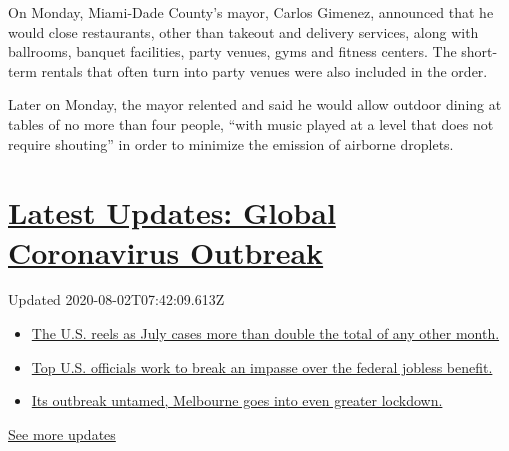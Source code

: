 On Monday, Miami-Dade County's mayor, Carlos Gimenez, announced that he
would close restaurants, other than takeout and delivery services, along
with ballrooms, banquet facilities, party venues, gyms and fitness
centers. The short-term rentals that often turn into party venues were
also included in the order.

Later on Monday, the mayor relented and said he would allow outdoor
dining at tables of no more than four people, ``with music played at a
level that does not require shouting'' in order to minimize the emission
of airborne droplets.

\hypertarget{latest-updates-global-coronavirus-outbreak}{%
\section{\texorpdfstring{\href{https://www.nytimes.com/2020/08/01/world/coronavirus-covid-19.html?action=click\&pgtype=Article\&state=default\&region=MAIN_CONTENT_1\&context=storylines_live_updates}{Latest
Updates: Global Coronavirus
Outbreak}}{Latest Updates: Global Coronavirus Outbreak}}\label{latest-updates-global-coronavirus-outbreak}}

Updated 2020-08-02T07:42:09.613Z

\begin{itemize}
\tightlist
\item
  \href{https://www.nytimes.com/2020/08/01/world/coronavirus-covid-19.html?action=click\&pgtype=Article\&state=default\&region=MAIN_CONTENT_1\&context=storylines_live_updates\#link-34047410}{The
  U.S. reels as July cases more than double the total of any other
  month.}
\item
  \href{https://www.nytimes.com/2020/08/01/world/coronavirus-covid-19.html?action=click\&pgtype=Article\&state=default\&region=MAIN_CONTENT_1\&context=storylines_live_updates\#link-780ec966}{Top
  U.S. officials work to break an impasse over the federal jobless
  benefit.}
\item
  \href{https://www.nytimes.com/2020/08/01/world/coronavirus-covid-19.html?action=click\&pgtype=Article\&state=default\&region=MAIN_CONTENT_1\&context=storylines_live_updates\#link-2bc8948}{Its
  outbreak untamed, Melbourne goes into even greater lockdown.}
\end{itemize}

\href{https://www.nytimes.com/2020/08/01/world/coronavirus-covid-19.html?action=click\&pgtype=Article\&state=default\&region=MAIN_CONTENT_1\&context=storylines_live_updates}{See
more updates}

